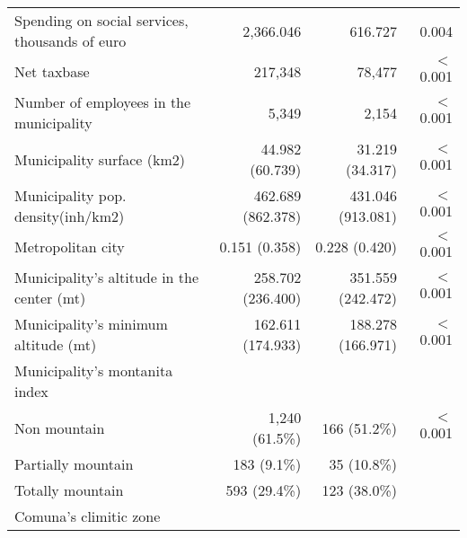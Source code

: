 \begin{table}[H]
\begin{tabular}{llll}
\multicolumn{1}{l}{Spending on social services, thousands of euro} &
  \multicolumn{1}{r}{2,366.046} &
  \multicolumn{1}{r}{616.727} &
  \multicolumn{1}{r}{0.004} \\
\multicolumn{1}{l}{Net taxbase} &
  \multicolumn{1}{r}{217,348} &
  \multicolumn{1}{r}{78,477} &
  \multicolumn{1}{r}{$<$0.001} \\
\multicolumn{1}{l}{Number of employees in the municipality} &
  \multicolumn{1}{r}{5,349} &
  \multicolumn{1}{r}{2,154} &
  \multicolumn{1}{r}{$<$0.001} \\
\multicolumn{1}{l}{Municipality surface (km2)} &
  \multicolumn{1}{r}{44.982 (60.739)} &
  \multicolumn{1}{r}{31.219 (34.317)} &
  \multicolumn{1}{r}{$<$0.001} \\
\multicolumn{1}{l}{Municipality pop. density(inh/km2)} &
  \multicolumn{1}{r}{462.689 (862.378)} &
  \multicolumn{1}{r}{431.046 (913.081)} &
  \multicolumn{1}{r}{$<$0.001} \\
\multicolumn{1}{l}{Metropolitan city} &
  \multicolumn{1}{r}{0.151 (0.358)} &
  \multicolumn{1}{r}{0.228 (0.420)} &
  \multicolumn{1}{r}{$<$0.001} \\
\multicolumn{1}{l}{Municipality's altitude in the center (mt)} &
  \multicolumn{1}{r}{258.702 (236.400)} &
  \multicolumn{1}{r}{351.559 (242.472)} &
  \multicolumn{1}{r}{$<$0.001} \\
\multicolumn{1}{l}{Municipality's minimum altitude (mt)} &
  \multicolumn{1}{r}{162.611 (174.933)} &
  \multicolumn{1}{r}{188.278 (166.971)} &
  \multicolumn{1}{r}{$<$0.001} \\
\multicolumn{1}{l}{Municipality's montanita index} &
  \multicolumn{1}{r}{} &
  \multicolumn{1}{r}{} &
  \multicolumn{1}{r}{} \\
\multicolumn{1}{l}{\hspace{1em}Non mountain} &
  \multicolumn{1}{r}{1,240 (61.5\%)} &
  \multicolumn{1}{r}{166 (51.2\%)} &
  \multicolumn{1}{r}{$<$0.001} \\
\multicolumn{1}{l}{\hspace{1em}Partially mountain} &
  \multicolumn{1}{r}{183 (9.1\%)} &
  \multicolumn{1}{r}{35 (10.8\%)} &
  \multicolumn{1}{r}{} \\
\multicolumn{1}{l}{\hspace{1em}Totally mountain} &
  \multicolumn{1}{r}{593 (29.4\%)} &
  \multicolumn{1}{r}{123 (38.0\%)} &
  \multicolumn{1}{r}{} \\
\multicolumn{1}{l}{Comuna's climitic zone} &
  \multicolumn{1}{r}{} &
  \multicolumn{1}{r}{} &
  \multicolumn{1}{r}{} \\

\end{tabular}
\end{table}
